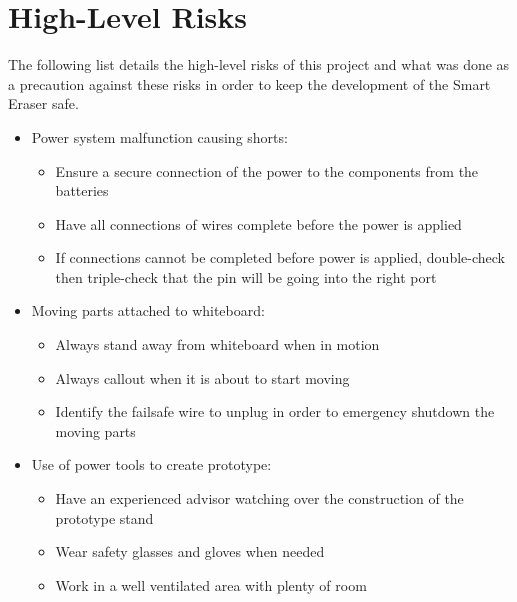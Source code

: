\section{High-Level Risks}
The following list details the high-level risks of this project and what was done as a precaution against these risks in order to keep the development of the Smart Eraser safe.
\begin{itemize}
	\item Power system malfunction causing shorts:
		\begin{itemize}
		\item Ensure a secure connection of the power to the components from the batteries
		\item Have all connections of wires complete before the power is applied
		\item If connections cannot be completed before power is applied, double-check then triple-check that the pin will be going into the right port
		\end{itemize}
	\item Moving parts attached to whiteboard:
		\begin{itemize}
		\item Always stand away from whiteboard when in motion
		\item Always callout when it is about to start moving
		\item Identify the failsafe wire to unplug in order to emergency shutdown the moving parts
		\end{itemize}
	\item Use of power tools to create prototype:
		\begin{itemize}
		\item Have an experienced advisor watching over the construction of the prototype stand
		\item Wear safety glasses and gloves when needed
		\item Work in a well ventilated area with plenty of room
		\end{itemize}
\end{itemize}

